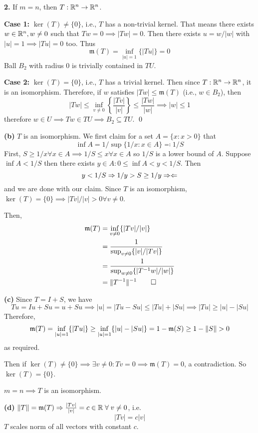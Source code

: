 \documentclass[a4paper, 12pt]{article}
\begin{document}
\begin{solution}
    \textbf{2.} If $m = n$, then $T: \mathbb{R}^n \to \mathbb{R}^n$.
    
    \textbf{Case 1:} $\ker(T) \neq \{0\}$, i.e., $T$ has a non-trivial kernel. That means there exists $w \in \mathbb{R}^n, w \neq 0$ such that $Tw = 0 \implies |Tw| = 0$. Then there exists $u = w/|w|$ with $|u| = 1 \implies |Tu| = 0$ too. Thus \[
    \mathfrak{m}(T) = \inf_{|u| = 1} \{|Tu|\} = 0
    \]
    Ball $B_2$ with radius 0 is trivially contained in $TU$.

    \textbf{Case 2: }$\ker(T) = \{0\}$, i.e., $T$ has a trivial kernel. Then since $T: \mathbb{R}^n \to \mathbb{R}^n$, it is an isomorphism. Therefore, if $w$ satisfies $|Tw| \leq \mathfrak{m}(T)$ (i.e., $w \in B_2$), then \[
    |Tw| \leq \inf_{v \neq 0} \left\{\frac{|Tv|}{|v|}\right\} \leq \frac{|Tw|}{|w|} \implies |w| \leq 1
    \]
    therefore $w \in U \implies Tw \in TU \implies B_2 \subseteq TU$. \qed

    \textbf{(b)} $T$ is an isomorphism. We first claim for a set $A = \{x : x > 0\}$ that \[
    \inf A = 1/\sup \{1/x: x \in A\} \eqqcolon 1/S
    \]
    First, $S \geq 1/x \forall x \in A \implies 1/S \leq x \forall x \in A$ so $1/S$ is a lower bound of $A$. Suppose $\inf A < 1/S$ then there exists $y \in A: 0 \leq \inf A < y < 1/S$. Then \[
    y < 1/S \Rightarrow 1/y > S \geq 1/y \Rightarrow\Leftarrow
    \]
    and we are done with our claim. Since $T$ is an isomorphism, $\ker(T) = \{0\} \implies |Tv|/|v| > 0 \forall v \neq 0$.

    Then, \begin{align*}
    \mathfrak{m}(T) &= \inf_{v \neq 0}\{|Tv|/|v|\} \\
    &= \frac{1}{\sup_{v \neq 0}\{|v|/|Tv|\}} \\
    &= \frac{1}{\sup_{w \neq 0}\{|T^{-1}w|/|w|\}}\\
    &= \lVert T^{-1}\rVert^{-1} \qed
    \end{align*}

    \textbf{(c)} Since $T = I + S$, we have \[
    Tu = Iu + Su = u + Su \implies |u| = |Tu - Su| \leq |Tu| + |Su| \implies |Tu| \geq |u| - |Su|
    \]
    Therefore, \[
    \mathfrak{m}(T) = \inf_{|u| = 1}\{|Tu|\} \geq \inf_{|u| = 1}\{|u| - |Su|\} = 1 - \mathfrak{m}(S) \geq 1 - \lVert S\rVert > 0
    \]
    as required.

    Then if $\ker(T) \neq \{0\} \implies \exists v \neq 0: Tv = 0 \implies \mathfrak{m}(T) = 0$, a contradiction. So $\ker(T) = \{0\}$.
    
    $m = n \implies T$ is an isomorphism.

    \textbf{(d)} $\norm{T} = \mathfrak{m}(T) \implies \frac{|Tv|}{|v|} = c \in \bbr \forall v \neq 0$, i.e. \[
    |Tv| = c|v|
    \]
    $T$ scales norm of all vectors with constant $c$.
\end{solution}
\end{document}

